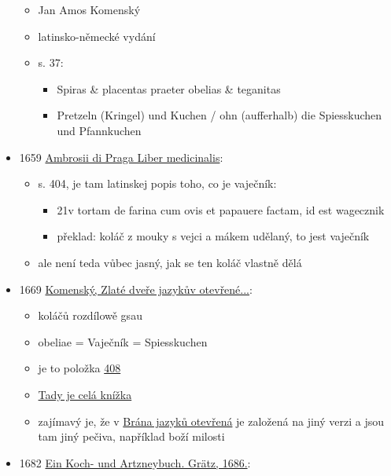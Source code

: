 \begin{itemize}
  \begin{itemize}
  \tightlist
  \item
    Jan Amos Komenský
  \item
    latinsko-německé vydání
  \item
    s. 37:

    \begin{itemize}
    \tightlist
    \item
      Spiras \& placentas praeter obelias \& teganitas
    \item
      Pretzeln (Kringel) und Kuchen / ohn (aufferhalb) die Spiesskuchen
      und Pfannkuchen
    \end{itemize}
  \end{itemize}
\item
  1659
  \href{https://ceskadigitalniknihovna.cz/uuid/uuid:d380c040-c80a-11ea-b7a2-005056827e51}{Ambrosii
  di Praga Liber medicinalis}:

  \begin{itemize}
  \tightlist
  \item
    s. 404, je tam latinskej popis toho, co je vaječník:

    \begin{itemize}
    \tightlist
    \item
      21v tortam de farina cum ovis et papauere factam, id est wagecznik
    \item
      překlad: koláč z mouky s vejci a mákem udělaný, to jest vaječník
    \end{itemize}
  \item
    ale není teda vůbec jasný, jak se ten koláč vlastně dělá
  \end{itemize}
\item
  1669
  \href{https://vokabular.ujc.cas.cz/moduly/mluvnice/digitalni-kopie-detail/KomJanua1669/strana-76}{Komenský,
  Zlaté dveře jazykův otevřené...}:

  \begin{itemize}
  \tightlist
  \item
    koláčů rozdílowě gsau
  \item
    obeliae = Vaječník = Spiesskuchen
  \item
    je to položka
    \href{https://vokabular.ujc.cas.cz/moduly/mluvnice/digitalni-kopie-detail/KomJanua1669/strana-76}{408}
  \item
    \href{https://vokabular.ujc.cas.cz/moduly/mluvnice/digitalni-kopie-info/KomJanua1669}{Tady
    je celá knížka}
  \item
    zajímavý je, že v
    \href{https://www.digitalniknihovna.cz/mzk/uuid/uuid:c53f79b0-b747-11e4-a7a2-005056827e51}{Brána
    jazyků otevřená} je založená na jiný verzi a jsou tam jiný pečiva,
    například boží milosti
  \end{itemize}
\item
  1682
  \href{https://www.deutschestextarchiv.de/book/view/graz_kochbuch_1686/?hl=Spie\%C3\%9F&p=43}{Ein
  Koch- und Artzneybuch. Grätz, 1686.}:


\end{itemize}
